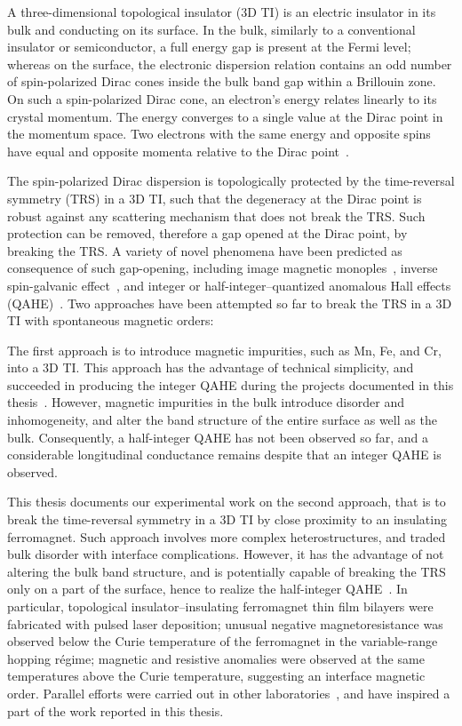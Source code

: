 A three-dimensional topological insulator (3D TI) is an electric insulator in its bulk and conducting on its surface. In the bulk, similarly to a conventional insulator or semiconductor, a full energy gap is present at the Fermi level; whereas on the surface, the electronic dispersion relation contains an odd number of spin-polarized Dirac cones inside the bulk band gap within a Brillouin zone. On such a spin-polarized Dirac cone, an electron's energy relates linearly to its crystal momentum. The energy converges to a single value at the Dirac point in the momentum space. Two electrons with the same energy and opposite spins have equal and opposite momenta relative to the Dirac point~\cite{TI_Qi, TI_Col}.

The spin-polarized Dirac dispersion is topologically protected by the time-reversal symmetry (TRS) in a 3D TI, such that the degeneracy at the Dirac point is robust against any scattering mechanism that does not break the TRS. Such protection can be removed, therefore a gap opened at the Dirac point, by breaking the TRS. A variety of novel phenomena have been predicted as consequence of such gap-opening, including image magnetic monoples~\cite{TI_birth, TI_monopole}, inverse spin-galvanic effect~\cite{ISG}, and integer or half-integer--quantized anomalous Hall effects (QAHE)~\cite{TI_Col, QAH_TI_Yu}. Two approaches have been attempted so far to break the TRS in a 3D TI with spontaneous magnetic orders:

The first approach is to introduce magnetic impurities, such as Mn, Fe, and Cr, into a 3D TI. This approach has the advantage of technical simplicity, and succeeded in producing the integer QAHE during the projects documented in this thesis~\cite{Chang2013, Kou2014}. However, magnetic impurities in the bulk introduce disorder and inhomogeneity, and alter the band structure of the entire surface as well as the bulk. Consequently, a half-integer QAHE has not been observed so far, and a considerable longitudinal conductance remains despite that an integer QAHE is observed.

This thesis documents our experimental work on the second approach, that is to break the time-reversal symmetry in a 3D TI by close proximity to an insulating ferromagnet. Such approach involves more complex heterostructures, and traded bulk disorder with interface complications. However, it has the advantage of not altering the bulk band structure, and is potentially capable of breaking the TRS only on a part of the surface, hence to realize the half-integer QAHE~\cite{TI_Col}. In particular, topological insulator--insulating ferromagnet thin film bilayers were fabricated with pulsed laser deposition; unusual negative magnetoresistance was observed below the Curie temperature of the ferromagnet in the variable-range hopping r\'egime; magnetic and resistive anomalies were observed at the same temperatures above the Curie temperature, suggesting an interface magnetic order. Parallel efforts were carried out in other laboratories~\cite{Moodera2013, Samarth2013, Moodera2016}, and have inspired a part of the work reported in this thesis.

